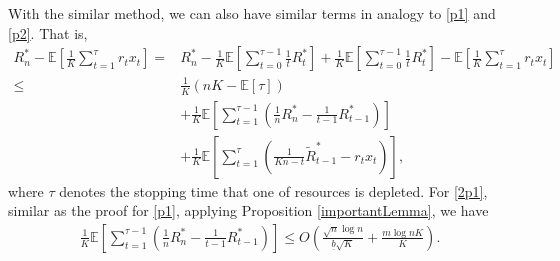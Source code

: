 \documentclass{article} %
\begin{document}
\begin{APPENDICES}
        With the similar method, we can also have similar terms in analogy to \eqref{p1} and \eqref{p2}. That is,
        \begin{align}
                    R_n^*-\mathbb{E}\left[\frac{1}{K}\sum\limits_{t=1}^{\tau}r_{t}x_{t}\right]\nonumber
                    =&
                    R_n^*-
                    \frac{1}{K}\mathbb{E}\left[\sum\limits_{t=0}^{\tau-1}\frac{1}{t}R_{t}^*\right]
                    + \frac{1}{K}\mathbb{E}\left[\sum\limits_{t=0}^{\tau-1}\frac{1}{t}R_{t}^*\right] -\mathbb{E}\left[\frac{1}{K}\sum\limits_{t=1}^{\tau}r_{t}x_{t}\right]\nonumber
                    \\
                    \leq&
                    \frac{1}{K}(nK-\mathbb{E}[\tau])\label{2p3}\\
                    &+\frac{1}{K}\mathbb{E}\left[\sum\limits_{t=1}^{\tau-1}\left(\frac{1}{n}R_n^*-\frac{1}{t-1}R_{t-1}^*\right)\right]\label{2p1}\\
                    &+
                    \frac{1}{K}\mathbb{E}\left[\sum\limits_{t=1}^{\tau}\left(\frac{1}{Kn-t}\tilde{R}_{t-1}^*-r_{t}x_{t}\right)
                    \right]\label{2p2},
     \end{align}
    where $\tau$ denotes the stopping time that one of resources is depleted. For \eqref{2p1}, similar as the proof for \eqref{p1}, applying Proposition \ref{importantLemma}, we have
    \begin{align*}
                    \frac{1}{K}\mathbb{E}\left[\sum\limits_{t=1}^{\tau-1}\left(\frac{1}{n}R_n^*-\frac{1}{t-1}R_{t-1}^*\right)\right]
                    \leq
                    O\left(\frac{\sqrt{n}\log n}{\underline{b}\sqrt{K}}  +\frac{m\log nK}{K}\right).
    \end{align*}
    

\end{APPENDICES}
\end{document}
